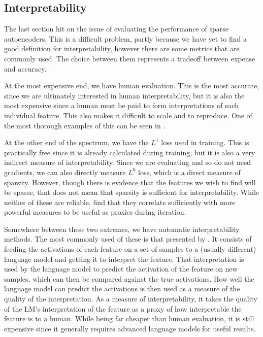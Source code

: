 \documentclass[../../main.tex]{subfiles}
\begin{document}

\subsection{Interpretability}
The last section hit on the issue of evaluating the performance of sparse autoencoders.
This is a difficult problem, partly because we have yet to find a good definition for interpretability, however there are some metrics that are commonly used.
The choice between them represents a tradeoff between expense and accuracy.

At the most expensive end, we have human evaluation.
This is the most accurate, since we are ultimately interested in human interpretability, but it is also the most expensive since a human must be paid to form interpretations of each individual feature.
This also makes it difficult to scale and to reproduce.
One of the most thorough examples of this can be seen in \citet{bricken_towards_2023}.

At the other end of the spectrum, we have the $L^1$ loss used in training.
This is practically free since it is already calculated during training, but it is also a very indirect measure of interpretability.
Since we are evaluating and so do not need gradients, we can also directly measure $L^0$ loss, which is a direct measure of sparsity.
However, though there is evidence that the features we wish to find will be sparse, that does not mean that sparsity is sufficient for interpretability.
While neither of these are reliable, \citet{bricken_towards_2023} find that they correlate sufficiently with more powerful measures to be useful as proxies during iteration.

Somewhere between these two extremes, we have automatic interpretability methods.
The most commonly used of these is that presented by \citet{bills_language_2023}.
It consists of feeding the activations of each feature on a set of samples to a (usually different) language model and getting it to interpret the feature.
That interpretation is used by the language model to predict the activation of the feature on new samples, which can then be compared against the true activations.
How well the language model can predict the activations is then used as a measure of the quality of the interpretation.
As a measure of interpretability, it takes the quality of the LM's interpretation of the feature as a proxy of how interpretable the feature is to a human.
While being far cheaper than human evaluation, it is still expensive since it generally requires advanced language models for useful results.
\end{document}
